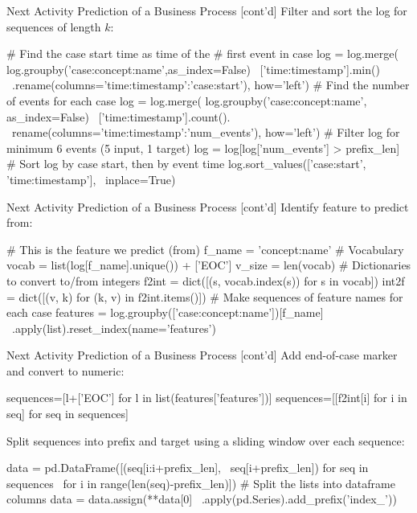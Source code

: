 \documentclass[ignorenonframetext,xcolor=x11names]{beamer}
\begin{document}
\begin{frame}[label=withcode,fragile]{Next Activity Prediction of a Business Process \small [cont'd]}
Filter and sort the log for sequences of length $k$:
\begin{pythoncode}
# Find the case start time as time of the 
# first event in case
log = log.merge( 
    log.groupby('case:concept:name',as_index=False) \
    ['time:timestamp'].min() \
    .rename(columns={'time:timestamp':'case:start'}), 
    how='left')
# Find the number of events for each case
log = log.merge( 
    log.groupby('case:concept:name', as_index=False) \
    ['time:timestamp'].count(). \
    rename(columns={'time:timestamp':'num_events'}), 
    how='left')
# Filter log for minimum 6 events (5 input, 1 target)
log = log[log['num_events'] > prefix_len]
# Sort log by case start, then by event time
log.sort_values(['case:start', 'time:timestamp'], \
    inplace=True)
\end{pythoncode}
\end{frame}


\begin{frame}[label=withcode,fragile]{Next Activity Prediction of a Business Process \small [cont'd]}
Identify feature to predict from:
\begin{pythoncode}
# This is the feature we predict (from)
f_name = 'concept:name'
# Vocabulary
vocab = list(log[f_name].unique()) + ['EOC']
v_size = len(vocab)
# Dictionaries to convert to/from integers
f2int = dict([(s, vocab.index(s)) for s in vocab])
int2f = dict([(v, k) for (k, v) in f2int.items()])
# Make sequences of feature names for each case
features = log.groupby(['case:concept:name'])[f_name] \
    .apply(list).reset_index(name='features')
\end{pythoncode}
\end{frame}


\begin{frame}[label=withcode,fragile]{Next Activity Prediction of a Business Process \small [cont'd]}
Add end-of-case marker and convert to numeric:
\begin{pythoncode}
sequences=[l+['EOC'] for l in list(features['features'])]
sequences=[[f2int[i] for i in seq] for seq in sequences]
\end{pythoncode}
Split sequences into prefix and target using a sliding window over each sequence:
\begin{pythoncode}
data = pd.DataFrame([(seq[i:i+prefix_len], \
    seq[i+prefix_len]) for seq in sequences \
    for i in range(len(seq)-prefix_len)])
# Split the lists into dataframe columns
data = data.assign(**data[0] \
    .apply(pd.Series).add_prefix('index_'))
\end{pythoncode}
\end{frame}
\end{document}
